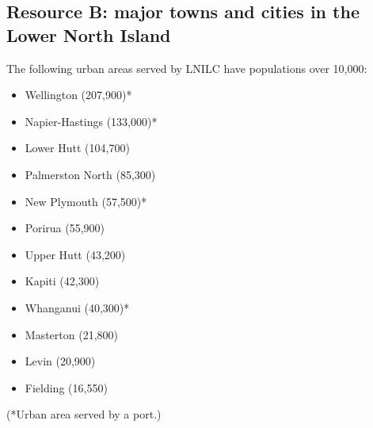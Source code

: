 \subsection*{Resource B: major towns and cities in the Lower North Island}
The following urban areas served by LNILC have populations over 10,000:
\begin{multicols}{2}
\begin{itemize}
  \item Wellington (207,900)*
  \item Napier-Hastings (133,000)*
  \item Lower Hutt (104,700)
  \item Palmerston North (85,300)
  \item New Plymouth (57,500)*
  \item Porirua (55,900)
  \item Upper Hutt (43,200)
  \item Kapiti (42,300)
  \item Whanganui (40,300)*
  \item Masterton (21,800)
  \item Levin (20,900)
  \item Fielding (16,550)
\end{itemize}
\end{multicols}
(*Urban area served by a port.)


